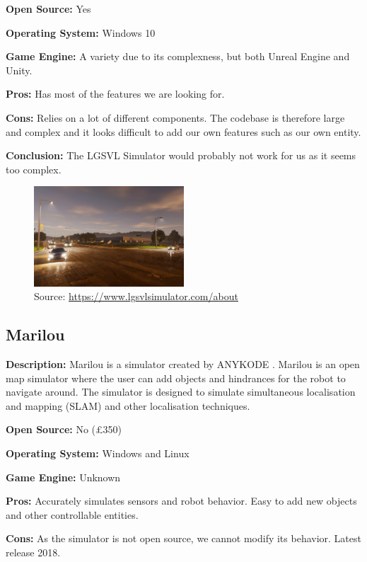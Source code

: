 \textbf{Open Source:} Yes

\textbf{Operating System:} Windows 10

\textbf{Game Engine:} A variety due to its complexness, but both Unreal Engine and Unity.

\textbf{Pros:} Has most of the features we are looking for.

\textbf{Cons:} Relies on a lot of different components. The codebase is therefore large and complex and it looks difficult to add our own features such as our own entity.

\textbf{Conclusion:} The LGSVL Simulator would probably not work for us as it seems too complex.

\begin{figure}[H]
    \centering
    \includegraphics[width=0.5\textwidth]{Simulators/LGSVL.jpg}
    \caption{Source: \url{https://www.lgsvlsimulator.com/about}}
\end{figure}

\subsection{Marilou}
\textbf{Description:} Marilou is a simulator created by ANYKODE \cite{Marilou_Web}. Marilou is an open map simulator where the user can add objects and hindrances for the robot to navigate around. The simulator is designed to simulate simultaneous localisation and mapping (SLAM) and other localisation techniques. 

\textbf{Open Source:} No (£350)

\textbf{Operating System:} Windows and Linux

\textbf{Game Engine:} Unknown

\textbf{Pros:} Accurately simulates sensors and robot behavior. Easy to add new objects and other controllable entities. 

\textbf{Cons:} As the simulator is not open source, we cannot modify its behavior. Latest release 2018.

